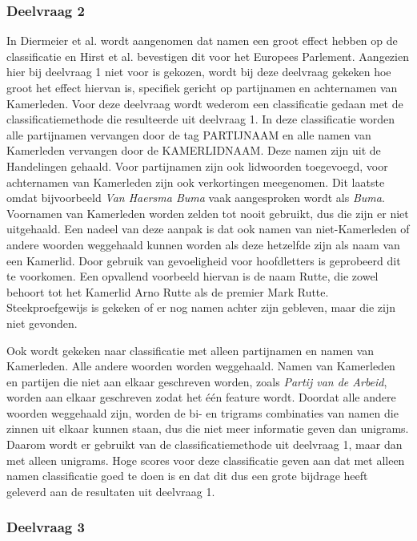 \subsubsection{Deelvraag 2}
In Diermeier et al. \cite{diermeier_godbout_yu_kaufmann_2012} wordt aangenomen dat namen een groot effect hebben op de classificatie en Hirst et al. \cite{Hirst_textto} bevestigen dit voor het Europees Parlement. Aangezien hier bij deelvraag 1 niet voor is gekozen, wordt bij deze deelvraag gekeken hoe groot het effect hiervan is, specifiek gericht op partijnamen en achternamen van Kamerleden. Voor deze deelvraag wordt wederom een classificatie gedaan met de classificatiemethode die resulteerde uit deelvraag 1. In deze classificatie worden alle partijnamen vervangen door de tag PARTIJNAAM en alle namen van Kamerleden vervangen door de KAMERLIDNAAM. Deze namen zijn uit de Handelingen gehaald. Voor partijnamen zijn ook lidwoorden toegevoegd, voor achternamen van Kamerleden zijn ook verkortingen meegenomen. Dit laatste omdat bijvoorbeeld \textit{Van Haersma Buma} vaak aangesproken wordt als \textit{Buma}. Voornamen van Kamerleden worden zelden tot nooit gebruikt, dus die zijn er niet uitgehaald. Een nadeel van deze aanpak is dat ook namen van niet-Kamerleden of andere woorden weggehaald kunnen worden als deze hetzelfde zijn als naam van een Kamerlid. Door gebruik van gevoeligheid voor hoofdletters is geprobeerd dit te voorkomen. Een opvallend voorbeeld hiervan is de naam Rutte, die zowel behoort tot het Kamerlid Arno Rutte als de premier Mark Rutte. Steekproefgewijs is gekeken of er nog namen achter zijn gebleven, maar die zijn niet gevonden. \par
Ook wordt gekeken naar classificatie met alleen partijnamen en namen van Kamerleden. Alle andere woorden worden weggehaald. Namen van Kamerleden en partijen die niet aan elkaar geschreven worden, zoals \textit{Partij van de Arbeid}, worden aan elkaar geschreven zodat het één feature wordt. Doordat alle andere woorden weggehaald zijn, worden de bi- en trigrams combinaties van namen die zinnen uit elkaar kunnen staan, dus die niet meer informatie geven dan unigrams. Daarom wordt er gebruikt van de classificatiemethode uit deelvraag 1, maar dan met alleen unigrams. Hoge scores voor deze classificatie geven aan dat met alleen namen classificatie goed te doen is en dat dit dus een grote bijdrage heeft geleverd aan de resultaten uit deelvraag 1. \par

\subsubsection{Deelvraag 3}

